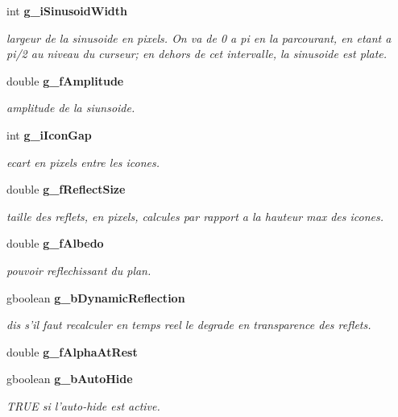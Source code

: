 \begin{CompactItemize}
int {\bf g\_\-i\-Sinusoid\-Width}
\begin{CompactList}\small\item\em largeur de la sinusoide en pixels. On va de 0 a pi en la parcourant, en etant a pi/2 au niveau du curseur; en dehors de cet intervalle, la sinusoide est plate. \item\end{CompactList}\item 
double {\bf g\_\-f\-Amplitude}
\begin{CompactList}\small\item\em amplitude de la siunsoide. \item\end{CompactList}\item 
int {\bf g\_\-i\-Icon\-Gap}
\begin{CompactList}\small\item\em ecart en pixels entre les icones. \item\end{CompactList}\item 
double {\bf g\_\-f\-Reflect\-Size}
\begin{CompactList}\small\item\em taille des reflets, en pixels, calcules par rapport a la hauteur max des icones. \item\end{CompactList}\item 
double {\bf g\_\-f\-Albedo}
\begin{CompactList}\small\item\em pouvoir reflechissant du plan. \item\end{CompactList}\item 
gboolean {\bf g\_\-b\-Dynamic\-Reflection}
\begin{CompactList}\small\item\em dis s'il faut recalculer en temps reel le degrade en transparence des reflets. \item\end{CompactList}\item 
double {\bf g\_\-f\-Alpha\-At\-Rest}
\item 
gboolean {\bf g\_\-b\-Auto\-Hide}
\begin{CompactList}\small\item\em TRUE si l'auto-hide est active. \item\end{CompactList}\item 

\end{CompactItemize}
